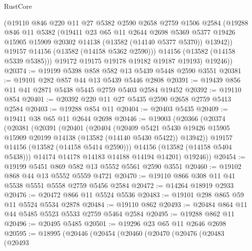 \begin{lexlean}{RustCore}
\begin{coremodule}
            (@19110
              @846
              @220
              @11
              @27
              @5382
              @2590
              @2658
              @2759
              @1506
              @2584
              (@19288
                @846
                @11
                @5382
                (@19411
                  @23
                  @65
                  @11
                  @2644
                  @2698
                  @5369
                  @5377
                  @19426
                  @15905
                  @15909
                  @20302
                  @14138
                  (@13582 (@14140 @5377 @5370))
                  @13942))
              @19157
              @14156
              (@13582 (@14158 @5362 @2590)))
            @14156
            (@13582 (@14158 @5339 @5385)))
          @19172
          @19175
          @19178
          @19182
          @19187
          @19193)
        @19246))
@20374 := @19199 @5398 @858 @582 @13 @5439 @5448 @2590 @3551
@20381 := @19101 @282 @857 @44 @13 @5439 @5446 @2808
@20391 := @19439 @856 @11 @41 @2871 @5438 @5445 @2759 @5403 @2584 @19452
@20392 := @19110 @854
@20401 := @20392 @220 @11 @27 @5435 @2590 @2658 @2759 @5413 @2584
@20403 := @19288 @854 @11
@20404 := @20403 @5435
@20409 := @19411 @38 @65 @11 @2644 @2698
@20446 := @19003
    (@20366
      (@20374
        (@20381
          (@20391
            (@20401
              (@20404
                (@20409
                  @5421
                  @5430
                  @19426
                  @15905
                  @15909
                  @20199
                  @14138
                  (@13582 (@14140 @5430 @5422))
                  @13942))
              @19157
              @14156
              (@13582 (@14158 @5414 @2590)))
            @14156
            (@13582 (@14158 @5404 @5438)))
          @14174
          @14178
          @14183
          @14188
          @14194
          @14201)
        @19246))
@20454 := @19199 @5451 @869 @582 @13 @5552 @5561 @2590 @3551
@20460 := @19102 @868 @44 @13 @5552 @5559 @4721
@20470 := @19110 @866 @308 @11 @41 @5538 @5551 @5558 @2759 @5456 @2584
@20472 := @14264 @18919 @2933
@20476 := @20472 @866 @11 @5524 @5536
@20483 := @19101 @298 @865 @59 @11 @5524 @5534 @2878
@20484 := @19110 @862
@20493 := @20484 @864 @11 @44 @5485 @5523 @5533 @2759 @5464 @2584
@20495 := @19288 @862 @11
@20496 := @20495 @5485
@20501 := @19296 @23 @65 @11 @2646 @2698
@20595 := @18995
    (@20446
      (@20454
        (@20460
          (@20470
            (@20476
              (@20483
                (@20493

\end{coremodule}
\end{lexlean}
